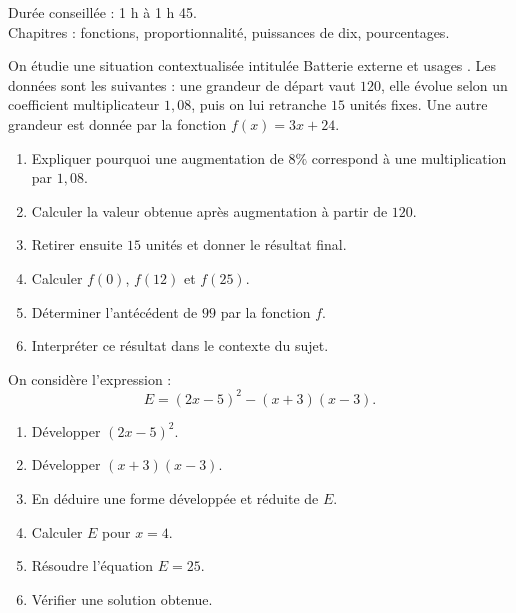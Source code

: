 \documentclass[11pt,a4paper]{article}
\newcounter{exercice}
\begin{document}
\begin{objectif}
Durée conseillée : 1 h à 1 h 45.\\
Chapitres : fonctions, proportionnalité, puissances de dix, pourcentages.
\end{objectif}
\begin{exercice}
On étudie une situation contextualisée intitulée \og Batterie externe et usages \fg. Les données sont les suivantes : une grandeur de départ vaut $120$, elle évolue selon un coefficient multiplicateur $1{,}08$, puis on lui retranche $15$ unités fixes. Une autre grandeur est donnée par la fonction $f(x)=3x+24$.
\begin{enumerate}
  \item Expliquer pourquoi une augmentation de $8\%$ correspond à une multiplication par $1{,}08$.
  \item Calculer la valeur obtenue après augmentation à partir de $120$.
  \item Retirer ensuite $15$ unités et donner le résultat final.
  \item Calculer $f(0)$, $f(12)$ et $f(25)$.
  \item Déterminer l'antécédent de $99$ par la fonction $f$.
  \item Interpréter ce résultat dans le contexte du sujet.
\end{enumerate}
\end{exercice}

\begin{exercice}
On considère l'expression :
\[
E=(2x-5)^2-(x+3)(x-3).
\]
\begin{enumerate}
  \item Développer $(2x-5)^2$.
  \item Développer $(x+3)(x-3)$.
  \item En déduire une forme développée et réduite de $E$.
  \item Calculer $E$ pour $x=4$.
  \item Résoudre l'équation $E=25$.
  \item Vérifier une solution obtenue.
\end{enumerate}
\end{exercice}
\end{document}
